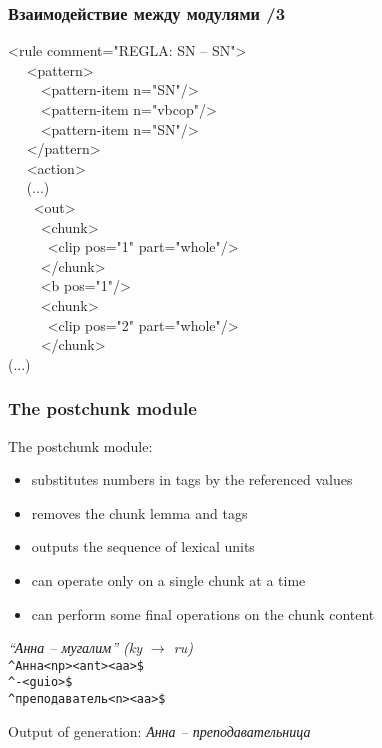 \documentclass[10pt,xetex]{beamer} %
\begin{document}
\begin{frame}
\frametitle{Взаимодействие между модулями /3}

\begin{exampleblock}{}
\begin{small}
  <rule comment="REGLA: SN -- SN">\\
  ~~  <pattern>\\
  ~~~~	<pattern-item n="SN"/>\\
  ~~~~	<pattern-item n="vbcop"/>\\
  ~~~~	<pattern-item n="SN"/>\\
  ~~ </pattern>\\
  ~~ <action>\\
  ~~ (...)\\
  ~~~	<out>\\
  ~~~~	  <chunk>\\
  ~~~~~	    <clip pos="1" part="whole"/>\\
  ~~~~	  </chunk>\\
  ~~~~	  <b pos="1"/>\\
  ~~~~	  <chunk>\\
  ~~~~~	    <clip pos="2" part="whole"/>\\
  ~~~~	  </chunk>\\
(...)
\end{small}
\end{exampleblock}
\end{frame}


\begin{frame}
\frametitle{The postchunk module}

The postchunk module:
\begin{itemize}
\item substitutes numbers in tags by the referenced values

\item removes the chunk lemma and tags
\item outputs the sequence of lexical units
\item can operate only on a single chunk at a time
\item can perform some final operations on the chunk content
\newline

\end{itemize}

\begin{exampleblock}{}
\emph{``Анна -- мугалим'' (ky $\rightarrow$ ru)}\\
\texttt{\^{}Анна<np><ant>{\color{blue}{<f>}}<aa>{\color{red}{<sg>}}{\color{green}{<nom>}}\$} \\
\texttt{\^{}-<guio>\$} \\
\texttt{\^{}преподаватель<n>{\color{blue}{<f>}}<aa>{\color{red}{<sg>}}{\color{green}{<nom>}}\$} \\

\end{exampleblock}

Output of generation: {\em Анна -- преподавательница}
\end{frame}
\end{document}
